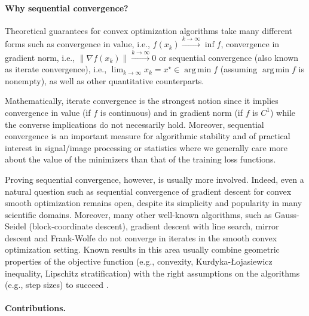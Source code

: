 \documentclass{article}
\theoremstyle{plain}
\theoremstyle{definition}
\theoremstyle{remark}
\newcommand{\argmin}{\operatorname{arg\,min}}
\begin{document}
\paragraph{Why sequential convergence?} Theoretical guarantees for convex optimization algorithms take many different forms such as convergence in value, i.e., $f(x_k) \overset{k \to \infty}{\longrightarrow} \inf f$, convergence in gradient norm, i.e., $\|\nabla f(x_k)\| \overset{k \to \infty}{\longrightarrow} 0$ or sequential convergence (also known as iterate convergence), i.e., $\lim_{k \to \infty} x_k = x^\star \in \argmin f$ (assuming $\argmin f$ is  nonempty), as well as other quantitative counterparts. 

Mathematically, iterate convergence is the strongest notion since it implies convergence in value (if $f$ is continuous) and in gradient norm (if $f$ is $C^1$) while the converse implications do not necessarily hold.
Moreover, sequential convergence is an important measure for algorithmic stability and of practical interest in signal/image processing \citep{chaux2009nested} or statistics where we generally care more about the value of the minimizers than that of the training loss functions. 

Proving sequential convergence, however, is usually more involved. Indeed, even a natural question such as sequential convergence of gradient descent for convex smooth optimization remains open, despite its simplicity and popularity in many scientific domains.
Moreover, many other well-known algorithms, such as Gauss-Seidel (block-coordinate descent), gradient descent with line search, mirror descent \citep{bolte2020curiosity} and Frank-Wolfe \citep{bolte2024frankwolfe} do not converge in iterates in the smooth convex optimization setting.
Known results in this area usually combine geometric properties of the objective function (e.g., convexity, Kurdyka-\L ojasiewicz inequality, Lipschitz stratification) with the right assumptions on the algorithms (e.g., step sizes) to succeed \citep{attouch2005convergence,traore2021sequential,lai2026diametersubgradientsequencesominimal,chzhen2026convergenceratessubgradientdescent,absil2005convergence}. 

\paragraph{Contributions.}
\end{document}
